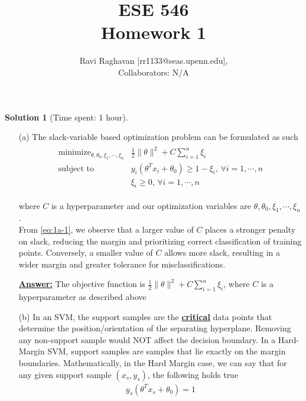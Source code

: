 \documentclass[11pt, reqno, letterpaper, twoside]{amsart}
\title{ESE 546\\[0.1in]
Homework 1}
\author{
Ravi Raghavan [rr1133@seas.upenn.edu],\\
Collaborators: N/A
}
\theoremstyle{plain}
\theoremstyle{definition}
\newtheorem{solution}[theorem]{Solution}
\begin{document}
\maketitle


\begin{solution}[Time spent: 1 hour]
\begin{enumerate}
    \item[(a)] The slack-variable based optimization problem can be formulated as such
    \begin{align}
        \label{eq:1a-1}
            \begin{array}{ll}
\text{minimize}_{\theta, \theta_0, \xi_1, \cdots, \xi_n} & \frac{1}{2} \|\theta\|^2 +  C \sum_{i = 1}^n \xi_i \\
\text{subject to} & y_i (\theta^T x_i + \theta_0) \geq 1 - \xi_i,\, \forall i = 1, \cdots, n \\
& \xi_i \geq 0,\, \forall i = 1, \cdots, n
\end{array}
        \end{align}

    where $C$ is a hyperparameter and our optimization variables are $\theta, \theta_0, \xi_1, \cdots, \xi_n$. \\
    \noindent From \eqref{eq:1a-1}, we observe that a larger value of $C$ places a stronger penalty on slack, reducing the margin and prioritizing correct classification of training points. Conversely, a smaller value of $C$ allows more slack, resulting in a wider margin and greater tolerance for misclassifications.  

\textbf{\underline{Answer:}} The objective function is $\frac{1}{2} \|\theta\|^2 +  C \sum_{i = 1}^n \xi_i$, where $C$ is a hyperparameter as described above

    \item[(b)] In an SVM, the support samples are the \textbf{\underline{critical}} data points that determine the position/orientation of the separating hyperplane. Removing any non-support sample would NOT affect the decision boundary. In a Hard-Margin SVM, support samples are samples that lie exactly on the margin boundaries. Mathematically, in the Hard Margin case, we can say that for any given support sample $(x_s, y_s)$, the following holds true 
    \begin{align}
    \label{eq:1a-2}
        y_s (\theta^T x_s + \theta_0) = 1
    \end{align}


\end{enumerate}
\end{solution}
\end{document}
